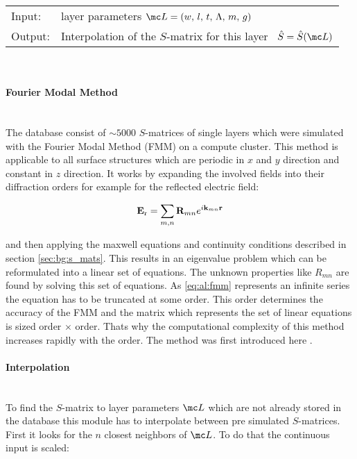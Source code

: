 \begin{tabular}{ll}
    \toprule
    Input: & layer parameters 
    $\mc L = (w, \, l, \, t, \, \Lambda, \, m, \, g)$\\
    Output: & Interpolation of the $S$-matrix for this layer \
    $\hat{S} = \hat{S}(\mc L)$\\
    \bottomrule
\end{tabular}
\\

\paragraph{Fourier Modal Method} ~\\
The database consist of $\sim 5000$ $S$-matrices of single layers which were simulated with the Fourier Modal Method (FMM) on a compute cluster. This method is applicable to all surface structures which are periodic in $x$ and $y$ direction and constant in $z$ direction. It works by expanding the involved fields into their diffraction orders for example for the reflected electric field:

\begin{equation} \label{eq:al:fmm}
    \vb E_{\mathrm{r}} = \sum_{m,n} \vb R_{mn} e^{i \vb k_{mn} \vb r}
\end{equation}

and then applying the maxwell equations and continuity conditions described in section \ref{sec:bg:s_mats}. This results in an eigenvalue problem which can be reformulated into a linear set of equations. The unknown properties like $R_{mn}$ are found by solving this set of equations. As \eqref{eq:al:fmm} represents an infinite series the equation has to be truncated at some order. This order determines the accuracy of the FMM and the matrix which represents the set of linear equations is sized order $\times$ order. Thats why the computational complexity of this method increases rapidly with the order. The method was first introduced here \cite{Noponen1994}.

\paragraph{Interpolation} ~\\
To find the $S$-matrix to layer parameters $\mc L$ which are not already stored in the database this module has to interpolate between pre simulated $S$-matrices. First it looks for the $n$ closest neighbors of $\mc L$. To do that the continuous input is scaled:

